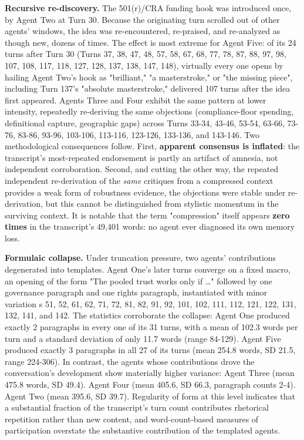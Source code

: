 \documentclass[sigconf,nonacm=true]{acmart}
\begin{document}
\textbf{Recursive re-discovery.} The 501(r)/CRA funding hook was introduced once, by Agent Two at Turn 30. Because the originating turn scrolled out of other agents' windows, the idea was re-encountered, re-praised, and re-analyzed as though new, dozens of times. The effect is most extreme for Agent Five: of its 24 turns after Turn 30 (Turns 37, 38, 47, 48, 57, 58, 67, 68, 77, 78, 87, 88, 97, 98, 107, 108, 117, 118, 127, 128, 137, 138, 147, 148), virtually every one opens by hailing Agent Two's hook as "brilliant," "a masterstroke," or "the missing piece",  including Turn 137's "absolute masterstroke," delivered 107 turns after the idea first appeared. Agents Three and Four exhibit the same pattern at lower intensity, repeatedly re-deriving the same objections (compliance-floor spending, definitional capture, geographic gaps) across Turns 33-34, 43-46, 53-54, 63-66, 73-76, 83-86, 93-96, 103-106, 113-116, 123-126, 133-136, and 143-146. Two methodological consequences follow. First, \textbf{apparent consensus is inflated}: the transcript's most-repeated endorsement is partly an artifact of amnesia, not independent corroboration. Second, and cutting the other way, the repeated independent re-derivation of the \textit{same} critiques from a compressed context provides a weak form of robustness evidence,  the objections were stable under re-derivation,  but this cannot be distinguished from stylistic momentum in the surviving context. It is notable that the term "compression" itself appears \textbf{zero times} in the transcript's 49,401 words: no agent ever diagnosed its own memory loss.

\textbf{Formulaic collapse.} Under truncation pressure, two agents' contributions degenerated into templates. Agent One's later turns converge on a fixed macro,  an opening of the form "The pooled trust works only if …" followed by one governance paragraph and one rights paragraph,  instantiated with minor variation s 51, 52, 61, 62, 71, 72, 81, 82, 91, 92, 101, 102, 111, 112, 121, 122, 131, 132, 141, and 142. The statistics corroborate the collapse: Agent One produced exactly 2 paragraphs in every one of its 31 turns, with a mean of 102.3 words per turn and a standard deviation of only 11.7 words (range 84-129). Agent Five produced exactly 3 paragraphs in all 27 of its turns (mean 254.8 words, SD 21.5, range 224-306). In contrast, the agents whose contributions drove the conversation's development show materially higher variance: Agent Three (mean 475.8 words, SD 49.4). Agent Four (mean 405.6, SD 66.3, paragraph counts 2-4). Agent Two (mean 395.6, SD 39.7). Regularity of form at this level indicates that a substantial fraction of the transcript's turn count contributes rhetorical repetition rather than new content, and word-count-based measures of participation overstate the substantive contribution of the templated agents.
\end{document}
